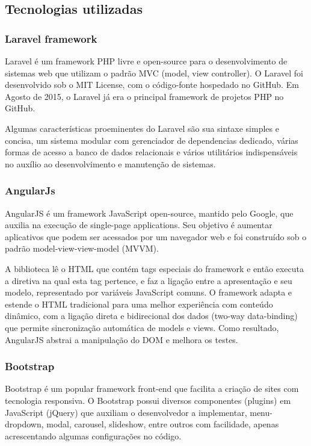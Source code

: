 \subsection{Tecnologias utilizadas}


\subsubsection{Laravel framework}


Laravel é um framework PHP livre e open-source para o desenvolvimento de sistemas web que utilizam o padrão MVC (model, view controller). O Laravel foi desenvolvido sob o MIT License, com o código-fonte hospedado no GitHub. Em Agosto de 2015, o Laravel já era o principal framework de projetos PHP no GitHub. 


Algumas características proeminentes do Laravel são sua sintaxe simples e concisa, um sistema modular com gerenciador de dependencias dedicado, várias formas de acesso a banco de dados relacionais e vários utilitários indispensáveis no auxílio ao desenvolvimento e manutenção de sistemas.   


\subsubsection{AngularJs}


AngularJS é um framework JavaScript open-source, mantido pelo Google, que auxilia na execução de single-page applications. Seu objetivo é aumentar aplicativos que podem ser acessados por um navegador web e foi construído sob o padrão model-view-view-model (MVVM).


A biblioteca lê o HTML que contém tags especiais do framework e então executa a diretiva na qual esta tag pertence, e faz a ligação entre a apresentação e seu modelo, representado por variáveis JavaScript comuns. O framework adapta e estende o HTML tradicional para uma melhor experiência com conteúdo dinâmico, com a ligação direta e bidirecional dos dados (two-way data-binding) que permite sincronização automática de models e views. Como resultado, AngularJS abstrai a manipulação do DOM e melhora os testes.


\subsubsection{Bootstrap}


Bootstrap é um popular framework front-end que facilita a criação de sites com tecnologia responsiva.
O Bootstrap possui diversos componentes (plugins) em JavaScript (jQuery) que auxiliam o desenvolvedor a implementar, menu-dropdown, modal, carousel, slideshow, entre outros com facilidade, apenas acrescentando algumas configurações no código.



